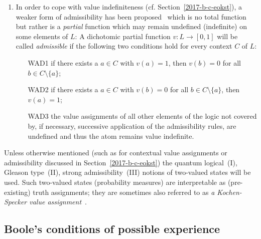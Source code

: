 \begin{enumerate}
\item
In order to cope with value indefiniteness (cf. Section~\ref{2017-b-c-eokst}),
a weaker form of admissibility has been proposed~\cite{Abbott:2010uq,2012-incomput-proofsCJ,PhysRevA.89.032109,2015-AnalyticKS}
which is no total function but rather is a {\em partial} function which may remain undefined (indefinite) on some elements of $L$:
A dichotomic partial function  $v: L \rightarrow [0,1]$  will be called
{\em admissible}
if  the following two conditions hold for every context $C$ of $L$:
\begin{enumerate}
\item[WAD1]  if there exists a $a\in C$ with $v(a)=1$, then $v(b)=0$ for all $b\in C\setminus\{a\}$;
\item[WAD2]   if there exists a $a\in C$ with $v(b)=0$ for all $b\in C\setminus\{a\}$, then $v(a)=1$;
\item[WAD3]    the value assignments of all other elements of the logic not covered by, if necessary, successive application of the admissibility rules,
are undefined and thus the atom remains value indefinite.
\end{enumerate}
\end{enumerate}

Unless otherwise mentioned (such as for contextual value assignments or admissibility discussed in Section~\ref{2017-b-c-eokst})
the quantum logical~(I), Gleason type~(II), strong admissibility~(III) notions of two-valued states will be used.
Such two-valued states (probability measures) are interpretable as (pre-existing) truth assignments; they are
sometimes also referred to as {\em a Kochen-Specker value assignment}~\cite{PhysRevLett.108.030402}.

\subsection{Boole's conditions of possible experience}
\label{2017-b-eh}

